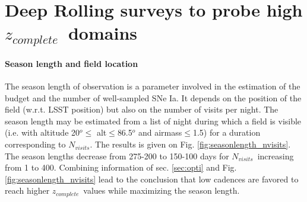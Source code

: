 \documentclass[\docopts]{\docclass}
\newcommand{\snrb}{\mbox{$SNR^b$}}
\newcommand{\sne}{{SNe Ia}}
\newcommand{\zcomp}{\mbox{$z_{complete}$}}
\newcommand{\nvisits}{$N_{visits}$}
\begin{document}

\section{Deep Rolling surveys to probe high \zcomp~domains}
\label{sec:scenario}
\paragraph{Season length and field location}
The season length of observation is a parameter involved in the estimation of the budget and the number of well-sampled \sne.  It depends on the position of the field (w.r.t. LSST position) but also on the number of visits per night. The season length may be estimated from a list of night during which a field is visible (i.e. with altitude 20$^o\leq$ alt$\leq$86.5$^o$ and airmass$\leq$1.5) for a duration corresponding to \nvisits.  The results is given on Fig. \ref{fig:seasonlength_nvisits}. The season lengths decrease from 275-200 to 150-100 days for \nvisits~increasing from 1 to 400.  Combining information of sec. \ref{sec:opti} and Fig. \ref{fig:seasonlength_nvisits} lead to the conclusion that low cadences are favored to reach higher \zcomp~values while maximizing the season length.
\end{document}
